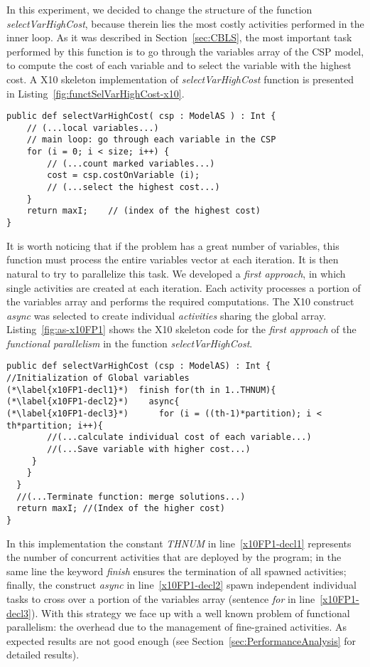 \documentclass{llncs}
\begin{document}
In this experiment, we decided to change the structure of the function
\emph{selectVarHighCost}, because therein lies the most costly activities
performed in the inner loop. As it was described in Section~\ref{sec:CBLS},
the most important task performed by this function is to go through the
variables array of the CSP model, to compute the cost of each variable and to
select the variable with the highest cost.  A
X10 skeleton implementation of \emph{selectVarHighCost} function is presented
in Listing~\ref{fig:functSelVarHighCost-x10}.

\begin{lstlisting}[caption={Function selVarHighCost in X10},label=fig:functSelVarHighCost-x10]
public def selectVarHighCost( csp : ModelAS ) : Int {
	// (...local variables...)
	// main loop: go through each variable in the CSP
	for (i = 0; i < size; i++) {
		// (...count marked variables...)
		cost = csp.costOnVariable (i);
		// (...select the highest cost...)
	}
	return maxI;	// (index of the highest cost)
}
\end{lstlisting}

It is worth noticing that if the problem has a great number of variables,
this function must process the entire variables vector at each iteration. It
is then natural to try to parallelize this task.  We developed a \emph{first
  approach}, in which  single activities are created at each iteration.
Each activity processes a portion of the variables array and performs the
required computations.  The X10 construct \emph{async} was selected to create
individual \emph{activities} sharing the global
array. Listing~\ref{fig:as-x10FP1} shows the X10 skeleton code for the
\emph{first approach} of the \emph{functional parallelism} in the function
\emph{selectVarHighCost}.

\begin{lstlisting}[caption={First approach to \emph{functional parallelism}},label=fig:as-x10FP1]
public def selectVarHighCost (csp : ModelAS) : Int {
//Initialization of Global variables
(*\label{x10FP1-decl1}*)  finish for(th in 1..THNUM){
(*\label{x10FP1-decl2}*)    async{
(*\label{x10FP1-decl3}*)      for (i = ((th-1)*partition); i < th*partition; i++){
        //(...calculate individual cost of each variable...)
        //(...Save variable with higher cost...)
     }
    }
  }
  //(...Terminate function: merge solutions...)
  return maxI; //(Index of the higher cost)
}
\end{lstlisting}

In this implementation the constant \emph{THNUM} in line~\ref{x10FP1-decl1}
represents the number of concurrent activities that are deployed by the
program; in the same line the keyword \emph{finish} ensures the termination
of all spawned activities; finally, the construct \emph{async} in
line~\ref{x10FP1-decl2} spawn independent individual tasks to cross over a
portion of the variables array (sentence \emph{for} in
line~\ref{x10FP1-decl3}).  With this strategy we face up with a well known
problem of functional parallelism: the overhead due to the management of
fine-grained activities. As expected results are not good enough (see
Section~\ref{sec:PerformanceAnalysis} for detailed results).
\end{document}
